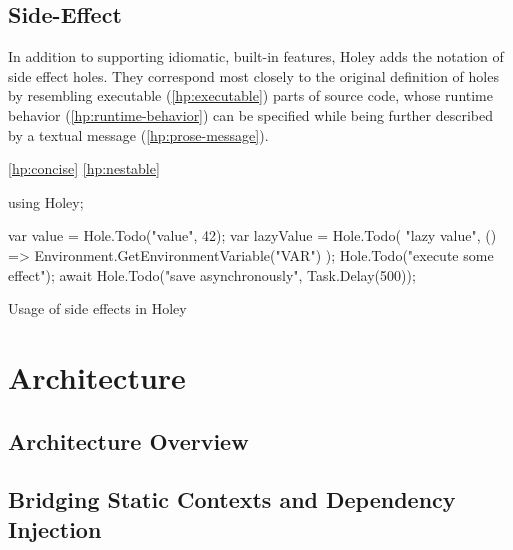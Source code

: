\subsection{Side-Effect}
\label{sec:hole-type-side-effect}
In addition to supporting idiomatic, built-in \CS features, Holey adds the notation of side effect holes.
They correspond most closely to the original definition of holes by resembling executable (\ref{hp:executable}) parts of source code, whose runtime behavior (\ref{hp:runtime-behavior}) can be specified while being further described by a textual message (\ref{hp:prose-message}).



\ref{hp:concise}
\ref{hp:nestable}

\begin{program}[ht]
\begin{CsCode}
using Holey;

var value = Hole.Todo("value", 42);
var lazyValue = Hole.Todo(
	"lazy value",
	() => Environment.GetEnvironmentVariable("VAR")
);
Hole.Todo("execute some effect");
await Hole.Todo("save asynchronously", Task.Delay(500));
\end{CsCode}
\caption{Usage of side effects in Holey}
\label{prg:holey-side-effects}
\end{program}

\section[Architecture]{Architecture }

\subsection{Architecture Overview}

\subsection{Bridging Static Contexts and Dependency Injection}


